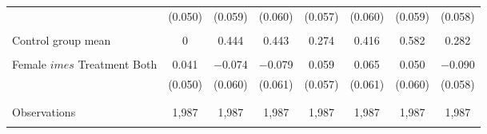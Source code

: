\begin{tabular}{@{\extracolsep{5pt}}lccccccc}
  & (0.050) & (0.059) & (0.060) & (0.057) & (0.060) & (0.059) & (0.058) \\ 
  & & & & & & & \\ 
 Control group mean & 0 & 0.444 & 0.443 & 0.274 & 0.416 & 0.582 & 0.282  \\ \hline \\[-1.8ex] Female $	imes$ Treatment Both & 0.041 & $-$0.074 & $-$0.079 & 0.059 & 0.065 & 0.050 & $-$0.090 \\ 
  & (0.050) & (0.060) & (0.061) & (0.057) & (0.061) & (0.060) & (0.058) \\ 
  & & & & & & & \\ 
\hline \\[-1.8ex] 

Observations & 1,987 & 1,987 & 1,987 & 1,987 & 1,987 & 1,987 & 1,987 \\ 
\hline 
\hline \\[-1.8ex] 
\end{tabular} 